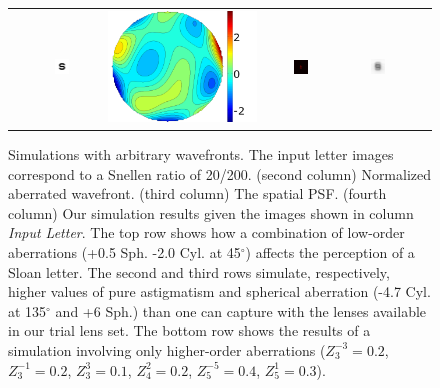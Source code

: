 \begin{figure}[h]
\begin{tabular}{@{}r@{ } c@{ } c@{ } c@{ } c@{ } c }
	\begin{sideways} \parbox[b]{25mm} {} \end{sideways} &
	\includegraphics[width= 0.22\textwidth]{__Images/05/synthetic_sims/S_20-200@4x.png} &
	\includegraphics[height=0.22\textwidth]{__Images/05/synthetic_sims/Wavefront_highorder.png} &
	\includegraphics[width= 0.22\textwidth]{__Images/05/synthetic_sims/PSF_highorder.png} &
	\includegraphics[width= 0.22\textwidth]{__Images/05/synthetic_sims/S_20-200_f50_simulated(high-order).png}			\\

	\end{tabular}
	
	\caption[Simulations with arbitrary wavefronts]{Simulations with arbitrary wavefronts. The input letter images correspond to a Snellen ratio of 20/200. (second column) Normalized aberrated wavefront. (third column) The spatial PSF. (fourth column) Our simulation results given the images shown in column \emph{Input Letter}. The top row shows how a combination of low-order aberrations (+0.5 Sph. -2.0 Cyl. at 45$^{\circ}$) affects the perception of a Sloan letter. The second and third rows simulate, respectively, higher values of pure astigmatism and spherical aberration (-4.7 Cyl. at 135$^{\circ}$ and +6 Sph.) than one can capture with the lenses available in our trial lens set. The bottom row shows the results of a simulation involving only higher-order aberrations ($Z^{-3}_{3}=0.2$, $Z^{-1}_{3}=0.2$, $Z^{3}_{3}=0.1$, $Z^{2}_{4}=0.2$, $Z^{-5}_{5}=0.4$, $Z^{1}_{5}=0.3$).}
	\label{fig:synthetic_sims}
\end{figure}

\clearpage
